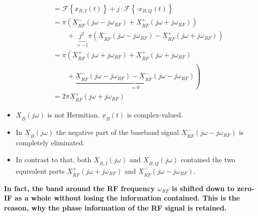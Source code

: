 \begin{refsection}
\begin{itemize}
\begin{equation}
\begin{split}
			 &= \mathcal{F}\left\{x_{B,I}(t)\right\} + j \cdot \mathcal{F}\left\{\cdot x_{B,Q}(t)\right\} \\
			 &= \pi \left(\underline{X}_{RF}^{-}\left(j\omega-j\omega_{RF}\right) + \underline{X}_{RF}^{+}\left(j\omega+j\omega_{RF}\right) \right) \\ & \qquad + \underbrace{j^2}_{= -1} \pi \left( \underline{X}_{RF}^{-}\left(j\omega-j\omega_{RF}\right) - \underline{X}_{RF}^{+}\left(j\omega+j\omega_{RF}\right) \right) \\
			 &= \pi \left( \underline{X}_{RF}^{+}\left(j\omega+j\omega_{RF}\right) + \underline{X}_{RF}^{+}\left(j\omega+j\omega_{RF}\right) \right. \\ & \qquad + \left. \underbrace{\underline{X}_{RF}^{-}\left(j\omega-j\omega_{RF}\right) - \underline{X}_{RF}^{-}\left(j\omega-j\omega_{RF}\right)}_{= 0} \right) \\
			 &= 2 \pi \underline{X}_{RF}^{+}\left(j\omega+j\omega_{RF}\right)
		\end{split}
	\end{equation}
	\item $\underline{X}_{B}\left(j\omega\right)$ is not Hermitian. $\underline{x}_B(t)$ is complex-valued.
	\item In $\underline{X}_{B}\left(j\omega\right)$ the negative part of the baseband signal $\underline{X}_{RF}^{-}\left(j\omega-j\omega_{RF}\right)$ is completely eliminated.
	\item In contrast to that, both $\underline{X}_{B,I}\left(j\omega\right)$ and $\underline{X}_{B,Q}\left(j\omega\right)$ contained the two equivalent parts $\underline{X}_{RF}^{+}\left(j\omega+j\omega_{RF}\right)$ and $\underline{X}_{RF}^{-}\left(j\omega-j\omega_{RF}\right)$.
\end{itemize}

\textbf{In fact, the band around the \ac{RF} frequency $\omega_{RF}$ is shifted down to zero-\acs{IF} as a whole without losing the information contained. This is the reason, why the phase information of the \ac{RF} signal is retained.}


\begin{figure}[H]
	\centering
	

\end{figure}
\end{refsection}
